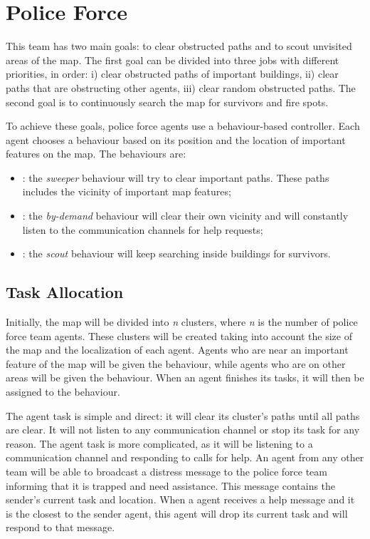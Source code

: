 \section{Police Force}
\label{sec:police}
This team has two main goals: to clear obstructed paths and to scout unvisited areas of the map. The first goal can be divided into three jobs with different priorities, in order: i) clear obstructed paths of important buildings, ii) clear paths that are obstructing other agents, iii) clear random obstructed paths. The second goal is to continuously search the map for survivors and fire spots.

To achieve these goals, police force agents use a behaviour-based controller. Each agent chooses a behaviour based on its position and the location of important features on the map. The behaviours are:

\begin{itemize}

  \item {}: the \textit{sweeper} behaviour will try to clear important paths. These paths includes the vicinity of important map features;

  \item {}: the \textit{by-demand} behaviour will clear their own vicinity and will constantly listen to the communication channels for help requests;

  \item {}: the \textit{scout} behaviour will keep searching inside buildings for survivors.

\end{itemize}

\subsection{Task Allocation}
Initially, the map will be divided into \emph{n} clusters, where \emph{n} is the number of police force team agents. These clusters will be created taking into account the size of the map and the localization of each agent. Agents who are near an important feature of the map will be given the  behaviour, while agents who are on other areas will be given the  behaviour. When an agent finishes its tasks, it will then be assigned to the  behaviour.

The  agent task is simple and direct: it will clear its cluster's paths until all paths are clear. It will not listen to any communication channel or stop its task for any reason. The  agent task is more complicated, as it will be listening to a communication channel and responding  to calls for help. An agent from any other team will be able to broadcast a distress message to the police force team informing that it is trapped and need assistance. This message contains the sender's current task and location. When a  agent receives a help message and it is the closest to the sender agent, this  agent will drop its current task and will respond to that message.

